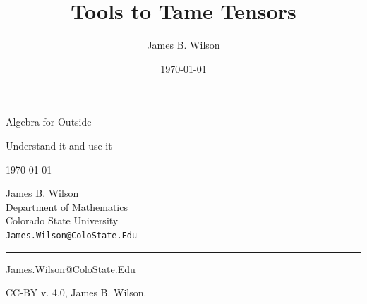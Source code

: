 \documentclass[12pt,twoside,letterpaper]{memoir}
\begin{document}
\author{James B. Wilson}
\title{Tools to Tame Tensors}
\date{\today}

      \begin{minipage}{\textwidth}
      \noindent
      {\titlefont Algebra for Outside}\par
      \epigraph{Understand it and use it}%
      {\today}
      \null\vfill
      \vspace*{1cm}
      \noindent
      \hfill
      \begin{minipage}{0.35\linewidth}
            \begin{flushright}
            James B. Wilson \vspace{50pt}\\
            Department of Mathematics \\
            Colorado State University\vspace{100pt} \\
            {\small \texttt{James.Wilson@ColoState.Edu}}\vspace{20pt} \\      
            \end{flushright}
      \end{minipage}
      \begin{minipage}{0.02\linewidth}
            \rule{1pt}{125pt}
      \end{minipage}
      \titlepagedecoration
      \end{minipage}

      \thispagestyle{empty}
      \newpage\thispagestyle{empty}





\vspace*{\fill}


\vspace*{\fill}\thispagestyle{empty}


\frontmatter%


\vspace*{\fill}

\bigskip
James.Wilson@ColoState.Edu
\bigskip

\noindent CC-BY v. 4.0, James B. Wilson.  
\end{document}
